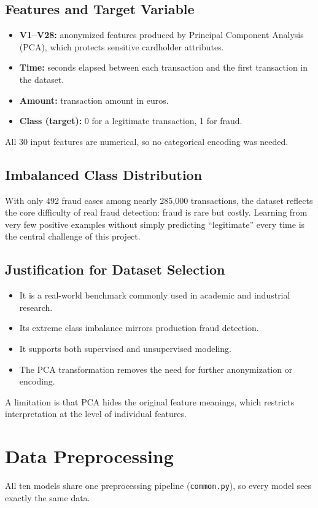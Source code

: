 \documentclass[journal]{IEEEtran}
\begin{document}
\subsection{Features and Target Variable}
\begin{itemize}
  \item \textbf{V1--V28:} anonymized features produced by Principal Component Analysis (PCA), which protects sensitive cardholder attributes.
  \item \textbf{Time:} seconds elapsed between each transaction and the first transaction in the dataset.
  \item \textbf{Amount:} transaction amount in euros.
  \item \textbf{Class (target):} 0 for a legitimate transaction, 1 for fraud.
\end{itemize}
All 30 input features are numerical, so no categorical encoding was needed.

\subsection{Imbalanced Class Distribution}
With only 492 fraud cases among nearly 285,000 transactions, the dataset reflects the core difficulty of real fraud detection: fraud is rare but costly. Learning from very few positive examples without simply predicting ``legitimate'' every time is the central challenge of this project.

\subsection{Justification for Dataset Selection}
\begin{itemize}
  \item It is a real-world benchmark commonly used in academic and industrial research.
  \item Its extreme class imbalance mirrors production fraud detection.
  \item It supports both supervised and unsupervised modeling.
  \item The PCA transformation removes the need for further anonymization or encoding.
\end{itemize}
A limitation is that PCA hides the original feature meanings, which restricts interpretation at the level of individual features.

\section{Data Preprocessing}
All ten models share one preprocessing pipeline (\texttt{common.py}), so every model sees exactly the same data.
\end{document}
